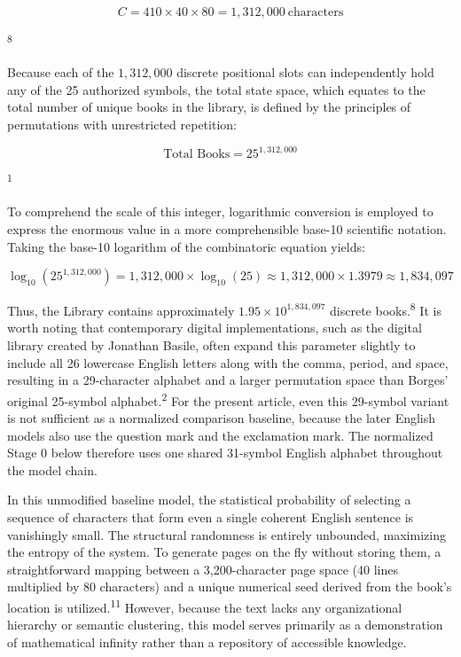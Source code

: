 \documentclass[
  11pt,
  a4paper,
]{article}
\begin{document}
\[
C = 410 \times 40 \times 80 = 1,312,000\ \text{characters}
\]

\textsuperscript{8}

Because each of the \(1,312,000\) discrete positional slots can independently hold any of the 25 authorized symbols, the total state space, which equates to the total number of unique books in the library, is defined by the principles of permutations with unrestricted repetition:

\[
\text{Total Books}=25^{1,312,000}
\]

\textsuperscript{1}

To comprehend the scale of this integer, logarithmic conversion is employed to express the enormous value in a more comprehensible base-10 scientific notation. Taking the base-10 logarithm of the combinatoric equation yields:

\[
\log_{10}(25^{1,312,000}) = 1,312,000 \times \log_{10}(25) \approx 1,312,000 \times 1.3979 \approx 1,834,097
\]

Thus, the Library contains approximately \(1.95 \times 10^{1,834,097}\) discrete books.\textsuperscript{8} It is worth noting that contemporary digital implementations, such as the digital library created by Jonathan Basile, often expand this parameter slightly to include all 26 lowercase English letters along with the comma, period, and space, resulting in a 29-character alphabet and a larger permutation space than Borges' original 25-symbol alphabet.\textsuperscript{2} For the present article, even this 29-symbol variant is not sufficient as a normalized comparison baseline, because the later English models also use the question mark and the exclamation mark. The normalized Stage 0 below therefore uses one shared 31-symbol English alphabet throughout the model chain.

In this unmodified baseline model, the statistical probability of selecting a sequence of characters that form even a single coherent English sentence is vanishingly small. The structural randomness is entirely unbounded, maximizing the entropy of the system. To generate pages on the fly without storing them, a straightforward mapping between a 3,200-character page space (40 lines multiplied by 80 characters) and a unique numerical seed derived from the book's location is utilized.\textsuperscript{11} However, because the text lacks any organizational hierarchy or semantic clustering, this model serves primarily as a demonstration of mathematical infinity rather than a repository of accessible knowledge.
\end{document}
